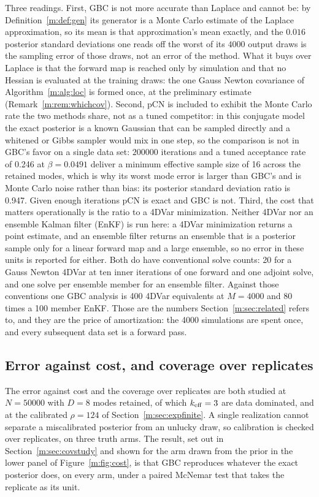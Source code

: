 Three readings. First, GBC is not more accurate than Laplace and cannot be: by Definition~\ref{m:def:gen} its generator is a Monte Carlo estimate of the Laplace approximation, so its mean is that approximation's mean exactly, and the $0.016$ posterior standard deviations one reads off the worst of its $4000$ output draws is the sampling error of those draws, not an error of the method. What it buys over Laplace is that the forward map is reached only by simulation and that no Hessian is evaluated at the training draws: the one Gauss Newton covariance of Algorithm~\ref{m:alg:loc} is formed once, at the preliminary estimate (Remark~\ref{m:rem:whichcov}). Second, pCN is included to exhibit the Monte Carlo rate the two methods share, not as a tuned competitor: in this conjugate model the exact posterior is a known Gaussian that can be sampled directly and a whitened or Gibbs sampler would mix in one step, so the comparison is not in GBC's favor on a single data set: $200000$ iterations and a tuned acceptance rate of 0.246 at $\beta=0.0491$ deliver a minimum effective sample size of 16 across the retained modes, which is why its worst mode error is larger than GBC's and is Monte Carlo noise rather than bias: its posterior standard deviation ratio is 0.947. Given enough iterations pCN is exact and GBC is not. Third, the cost that matters operationally is the ratio to a 4DVar minimization. Neither 4DVar nor an ensemble Kalman filter (EnKF) is run here: a 4DVar minimization returns a point estimate, and an ensemble filter returns an ensemble that is a posterior sample only for a linear forward map and a large ensemble, so no error in these units is reported for either. Both do have conventional solve counts: 20 for a Gauss Newton 4DVar at ten inner iterations of one forward and one adjoint solve, and one solve per ensemble member for an ensemble filter. Against those conventions one GBC analysis is 400 4DVar equivalents at $M=4000$ and 80 times a 100 member EnKF. Those are the numbers Section~\ref{m:sec:related} refers to, and they are the price of amortization: the 4000 simulations are spent once, and every subsequent data set is a forward pass.

\subsection{Error against cost, and coverage over replicates}\label{m:sec:expstudy}

The error against cost and the coverage over replicates are both studied at $N=50000$ with $D=8$ modes retained, of which $k_{\rm eff}=3$ are data dominated, and at the calibrated $\rho=124$ of Section~\ref{m:sec:expfinite}. A single realization cannot separate a miscalibrated posterior from an unlucky draw, so calibration is checked over replicates, on three truth arms. The result, set out in Section~\ref{m:sec:covstudy} and shown for the arm drawn from the prior in the lower panel of Figure~\ref{m:fig:cost}, is that GBC reproduces whatever the exact posterior does, on every arm, under a paired McNemar test that takes the replicate as its unit.

